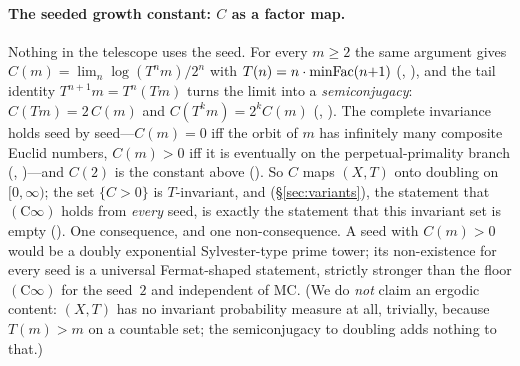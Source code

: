 \paragraph{The seeded growth constant: $C$ as a factor map.}
\label{sec:seeded-growth}
Nothing in the telescope uses the seed.  For every $m \ge 2$ the same
argument gives $C(m) = \lim_n \log(T^n m)/2^n$ with $T(n) = n \cdot
\mathrm{minFac}(n{+}1)$ (, ),
and the tail identity $T^{n+1} m = T^n(Tm)$ turns the limit into a
\emph{semiconjugacy}: $C(Tm) = 2\,C(m)$ and $C(T^k m) = 2^k C(m)$
(,
 ).  The complete
invariance holds seed by seed---$C(m) = 0$ iff the orbit of $m$ has
infinitely many composite Euclid numbers, $C(m) > 0$ iff it is eventually
on the perpetual-primality branch
(,
 )---and
$C(2)$ is the constant above
().  So $C$ maps
$(X,T)$ onto doubling on $[0,\infty)$; the set $\{C > 0\}$ is
$T$-invariant, and  (\S\ref{sec:variants}), the
statement that $(\mathrm{C}\infty)$ holds from \emph{every} seed, is
exactly the statement that this invariant set is empty
().
One consequence, and one non-consequence.  A seed with $C(m) > 0$ would be a doubly exponential
Sylvester-type prime tower; its non-existence for every seed is a
universal Fermat-shaped statement, strictly stronger than the floor
$(\mathrm{C}\infty)$ for the seed~$2$ and independent of MC.  (We do
\emph{not} claim an ergodic content: $(X,T)$ has no invariant probability
measure at all, trivially, because $T(m) > m$ on a countable set; the
semiconjugacy to doubling adds nothing to that.)

